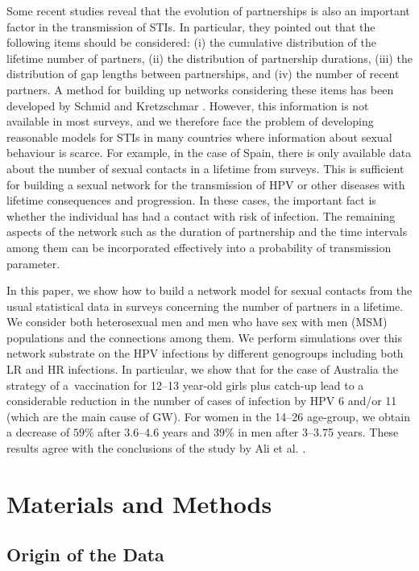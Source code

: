 Some recent studies reveal that the evolution of partnerships is also an important factor in the transmission of
STIs. In particular, they pointed out that the following items should be considered: (i) the cumulative distribution of the
lifetime number of partners, (ii) the distribution of partnership durations, (iii) the distribution of gap lengths between 
partnerships, and (iv) the number of recent partners. A method for building up networks considering these items has been developed by Schmid and Kretzschmar \cite{Schmid}. However, this information is not available in most surveys, and we therefore face the problem of developing reasonable models for STIs in many countries where information about
sexual behaviour is scarce. For example, in the case of Spain, there is only available data about the number of sexual contacts in a lifetime from surveys. This is sufficient for building a sexual network for the transmission of HPV or other diseases with lifetime consequences and progression. In these cases, the important fact is whether the individual has had a contact with risk of infection. The remaining aspects of the network such as the duration of partnership and the time intervals among them can be incorporated effectively into a probability of transmission parameter.

In this paper, we show how to build a network model for sexual contacts from the usual statistical data in surveys concerning the number of partners in a lifetime. We consider both heterosexual men and men who have sex with men (MSM) populations and the connections among them. We perform simulations over this network substrate on the HPV infections by different genogroups including both LR and HR infections. In particular, we show that for the case of Australia the strategy of a~vaccination for 12--13 year-old girls plus catch-up lead to a considerable reduction in the number of cases of infection by HPV 6 and/or 11 (which are the main cause of GW). For women in the 14--26 age-group, we obtain a decrease of $59\%$ after 3.6--4.6 years and $39\%$ in men after 3--3.75 years. These results agree with the conclusions of the study by Ali et al. \cite{Ali}.

\section{Materials and Methods}
\vspace{-6pt}

\subsection{Origin of the Data}

